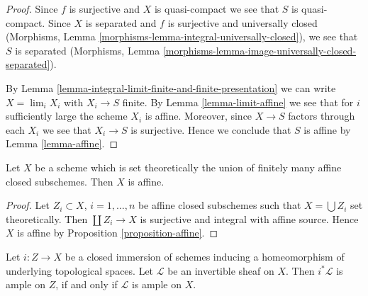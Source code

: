 \begin{proof}
Since $f$ is surjective and $X$ is quasi-compact we see that $S$ is
quasi-compact. Since $X$ is separated and $f$ is surjective and
universally closed (Morphisms, Lemma
\ref{morphisms-lemma-integral-universally-closed}), we see that $S$
is separated (Morphisms, Lemma
\ref{morphisms-lemma-image-universally-closed-separated}).

\medskip\noindent
By Lemma \ref{lemma-integral-limit-finite-and-finite-presentation}
we can write $X = \lim_i X_i$ with $X_i \to S$ finite. By
Lemma \ref{lemma-limit-affine}
we see that for $i$ sufficiently large the scheme $X_i$ is affine.
Moreover, since $X \to S$ factors through each $X_i$ we see that
$X_i \to S$ is surjective. Hence we conclude that $S$ is affine by
Lemma \ref{lemma-affine}.
\end{proof}

\begin{lemma}
\label{lemma-affines-glued-in-closed-affine}
Let $X$ be a scheme which is set theoretically the union of
finitely many affine closed subschemes. Then $X$ is affine.
\end{lemma}

\begin{proof}
Let $Z_i \subset X$, $i = 1, \ldots, n$ be affine closed subschemes such that
$X = \bigcup Z_i$ set theoretically. Then $\coprod Z_i \to X$ is surjective
and integral with affine source. Hence $X$ is affine by
Proposition \ref{proposition-affine}.
\end{proof}

\begin{lemma}
\label{lemma-ample-on-reduction}
Let $i : Z \to X$ be a closed immersion of schemes
inducing a homeomorphism of underlying topological spaces.
Let $\mathcal{L}$ be an invertible sheaf on $X$.
Then $i^*\mathcal{L}$ is ample on $Z$, if and only if $\mathcal{L}$
is ample on $X$.
\end{lemma}

